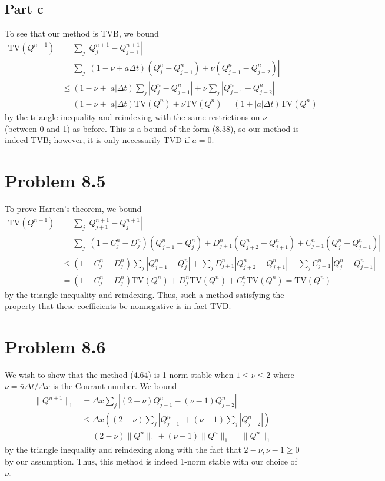 \documentclass{article}
\begin{document}
\subsection{Part c}
To see that our method is TVB, we bound
\begin{align*}
\text{TV}(Q^{n+1})&=\sum_j|Q^{n+1}_j-Q^{n+1}_{j-1}|\\&=
\sum_j|(1-\nu+a\Delta t)(Q^n_j-Q^n_{j-1})+\nu(Q^n_{j-1}-Q^n_{j-2})|\\&\leq
(1-\nu+|a|\Delta t)\sum_j|Q^n_j-Q^n_{j-1}|+\nu\sum_j|Q^n_{j-1}-Q^n_{j-2}|\\&=
(1-\nu+|a|\Delta t)\text{TV}(Q^n)+\nu\text{TV}(Q^n)=(1+|a|\Delta t)\text{TV}(Q^n)
\end{align*}
by the triangle inequality and reindexing with the same restrictions on $\nu$ (between 0 and 1) as before. This is a bound of the form (8.38), so our method is indeed TVB; however, it is only necessarily TVD if $a=0$.

\section{Problem 8.5}
To prove Harten's theorem, we bound
\begin{align*}
\text{TV}(Q^{n+1})&=\sum_j|Q^{n+1}_{j+1}-Q^{n+1}_j|\\&=
\sum_j\left|(1-C_j^n-D^n_j)(Q^n_{j+1}-Q^n_j)+D^n_{j+1}(Q^n_{j+2}-Q^n_{j+1})+C^n_{j-1}(Q^n_j-Q^n_{j-1})\right|\\&\leq
(1-C_j^n-D^n_j)\sum_j|Q^n_{j+1}-Q^n_j|+\sum_jD^n_{j+1}|Q^n_{j+2}-Q^n_{j+1}|+\sum_jC^n_{j-1}|Q^n_j-Q^n_{j-1}|\\&=
(1-C_j^n-D^n_j)\text{TV}(Q^n)+D^n_{j}\text{TV}(Q^n)+C^n_{j}\text{TV}(Q^n)=\text{TV}(Q^n)
\end{align*}
by the triangle inequality and reindexing. Thus, such a method satisfying the property that these coefficients be nonnegative is in fact TVD.

\section{Problem 8.6}
We wish to show that the method (4.64) is 1-norm stable when $1\leq\nu\leq2$ where $\nu=\bar{u}\Delta t/\Delta x$ is the Courant number. We bound 
\begin{align*}
\|Q^{n+1}\|_1&=\Delta x\sum_j\left|(2-\nu)Q^n_{j-1}-(\nu-1)Q^n_{j-2}\right|\\&\leq
\Delta x\left((2-\nu)\sum_j|Q^n_{j-1}|+(\nu-1)\sum_j|Q^n_{j-2}|\right)\\&=
(2-\nu)\|Q^n\|_1+(\nu-1)\|Q^n\|_1=\|Q^n\|_1
\end{align*}
by the triangle inequality and reindexing along with the fact that $2-\nu,\nu-1\geq0$ by our assumption. Thus, this method is indeed 1-norm stable with our choice of $\nu$.
\end{document}
